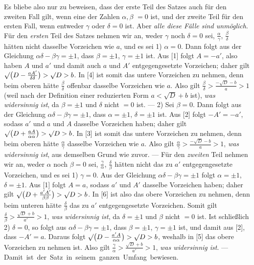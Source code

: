 Es bliebe also nur zu beweisen, dass der erste Teil des Satzes auch für den zweiten Fall gilt, wenn eine der Zahlen $\alpha,\beta$ $=0$ ist, und der zweite Teil für den ersten Fall, wenn entweder $\gamma$ oder $\delta=0$ ist. Aber \textit{alle diese Fälle sind unmöglich}. Für den \textit{ersten} Teil des Satzes nehmen wir an, weder $\gamma$ noch $\delta=0$ sei, $\frac{\alpha}{\gamma}$, $\frac{\beta}{\delta}$ hätten nicht dasselbe Vorzeichen wie $a$, und es sei 1) $\alpha=0$. Dann folgt aus der Gleichung $\alpha\delta-\beta\gamma=\pm1$, dass $\beta=\pm1$, $\gamma=\pm1$ ist. Aus [1] folgt $A=-a'$, also haben $A$ und $a'$ und damit auch $a$ und $A'$ entgegengesetzte Vorzeichen; daher gilt $\surd\bigl(D-\frac{aA'}{\delta\delta}\bigr)>\surd D>b$. In [4] ist somit das untere Vorzeichen zu nehmen, denn beim oberen hätte $\frac{\beta}{\delta}$ offenbar dasselbe Vorzeichen wie $a$. Also gilt $\frac{\beta}{\delta}>\frac{-\surd D-b}{a}>1$ (weil nach der Definition einer reduzierten Form $a<\surd D+b$ ist), \textit{was widersinnig ist}, da $\beta=\pm1$ und $\delta$ nicht $=0$ ist. --- 2) Sei $\beta=0$. Dann folgt aus der Gleichung $\alpha\delta-\beta\gamma=\pm1$, dass $\alpha=\pm1$, $\delta=\pm1$ ist. Aus [2] folgt $-A'=-a'$, sodass $a'$ und $a$ und $A$ dasselbe Vorzeichen haben; daher gilt ${\surd\bigl(D+\frac{aA}{\alpha\alpha}\bigr)}>\surd D>b$. In [3] ist somit das untere Vorzeichen zu nehmen, denn beim oberen hätte $\frac{\alpha}{\gamma}$ dasselbe Vorzeichen wie $a$. Also gilt $\frac{\alpha}{\gamma}>\frac{-\surd D-b}{a}>1$, \textit{was widersinnig ist}, aus demselben Grund wie zuvor. --- Für den \textit{zweiten} Teil nehmen wir an, weder $\alpha$ noch $\beta=0$ sei, $\frac{\gamma}{\alpha}$, $\frac{\delta}{\beta}$ hätten nicht das zu $a'$ entgegengesetzte Vorzeichen, und es sei 1) $\gamma=0$. Aus der Gleichung $\alpha\delta-\beta\gamma=\pm1$ folgt $\alpha=\pm1$, $\delta=\pm1$. Aus [1] folgt $A=a$, sodass $a'$ und $A'$ dasselbe Vorzeichen haben; daher gilt $\surd\bigl(D+\frac{a'A'}{\beta\beta}\bigr)>\surd D>b$. In [6] ist also das obere Vorzeichen zu nehmen, denn beim unteren hätte $\frac{\delta}{\beta}$ das zu $a'$ entgegengesetzte Vorzeichen. Somit gilt $\frac{\delta}{\beta}>\frac{\surd D+b}{a'}>1$, \textit{was widersinnig ist}, da $\delta=\pm1$ und $\beta$ nicht $=0$ ist. Ist schließlich 2) $\delta=0$, so folgt aus $\alpha\delta-\beta\gamma=\pm1$, dass $\beta=\pm1$, $\gamma=\pm1$ ist, und damit aus [2], dass $-A'=a$. Daraus folgt $\surd\bigl(D-\frac{a'A}{\alpha\alpha}\bigr)>\surd D>b$, weshalb in [5] das obere Vorzeichen zu nehmen ist. Also gilt $\frac{\gamma}{\alpha}>\frac{\surd D+b}{a'}>1$, \textit{was widersinnig ist}. --- \mbox{Damit ist der Satz in seinem ganzen Umfang bewiesen.}


